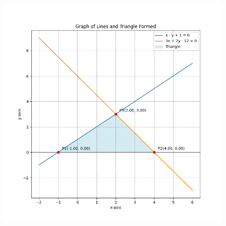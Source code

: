 \documentclass{beamer}
\theoremstyle{remark}
\numberwithin{equation}{section}
\begin{document}
\begin{frame}[fragile]
    \begin{figure}[h]
    \centering
    \includegraphics[width=\columnwidth]{figs/Figure_1.png}
 \end{figure}
\end{frame}
\end{document}
